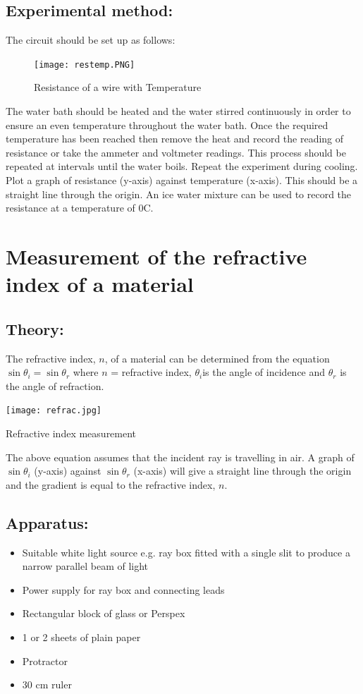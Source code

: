 \subsection{Experimental method:}
The circuit should be set up as follows:  
\begin{figure}
\texttt{[image: restemp.PNG]}
\caption{Resistance of a wire with Temperature}
\end{figure}
The water bath should be heated and the water stirred continuously in order to ensure an even temperature throughout the water bath.  Once the required temperature has been reached then remove the heat and record the reading of resistance or take the ammeter and voltmeter readings. This process should be repeated at intervals until the water boils.  
Repeat the experiment during cooling. Plot a graph of resistance (y-axis) against temperature (x-axis). This should be a straight line through the origin.  
An ice water mixture can be used to record the resistance at a temperature of 0C. 
\section{Measurement of the refractive index of a material}
 \subsection{Theory:}  
The refractive index, $n$, of a material can be determined from the equation $\sin \theta_{i} = \sin \theta_{r}$ where $n$ = refractive index, $\theta_{i}$is the angle of incidence and $\theta_{r}$ is the angle of refraction. \begin{marginfigure}
\texttt{[image: refrac.jpg]}
\caption{Refractive index measurement}
\end{marginfigure} The above equation assumes that the incident ray is travelling in air.  A graph of $\sin\theta_{i}$ (y-axis) against $\sin \theta_{r}$ (x-axis) will give a straight line through the origin and the gradient is equal to the refractive index, $n$.  
\subsection{Apparatus:} 
\begin{itemize}
\item Suitable white light source e.g. ray box fitted with a single slit to produce a narrow parallel beam of light 
\item Power supply for ray box and connecting leads 
\item Rectangular block of glass or Perspex 
\item 1 or 2 sheets of plain paper 
\item Protractor 
\item 30 cm ruler
\end{itemize}
